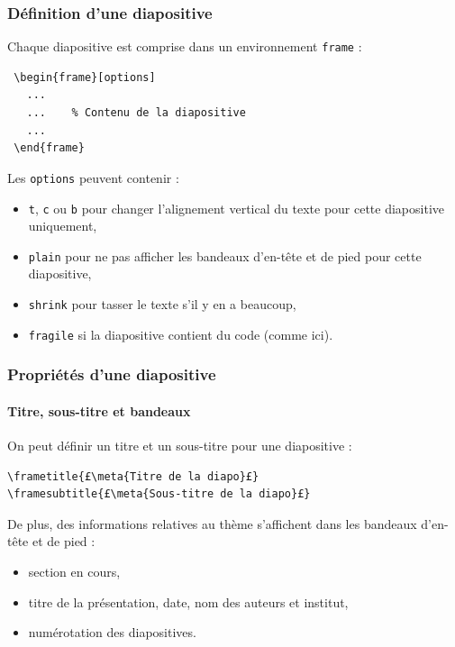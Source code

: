 \begin{frame}[fragile]
  \frametitle{Définition d'une diapositive}

Chaque diapositive est comprise dans un environnement \lstinline?frame? :

\begin{lstlisting}
 \begin{frame}[options]
   ...
   ...    % Contenu de la diapositive
   ...
 \end{frame}
\end{lstlisting}

\medskip
Les \lstinline?options? peuvent contenir :
\begin{itemize}
  \item \lstinline?t?, \lstinline?c? ou \lstinline?b? pour changer l'alignement vertical du texte pour cette diapositive uniquement,
  \item \lstinline?plain? pour ne pas afficher les bandeaux d'en-tête et de pied pour cette diapositive,
  \item \lstinline?shrink? pour tasser le texte s'il y en a beaucoup,
  \item \lstinline?fragile? si la diapositive contient du code (comme ici).
\end{itemize}
\end{frame}



\begin{frame}[fragile]
  \frametitle{Propriétés d'une diapositive}
  \framesubtitle{Titre, sous-titre et bandeaux}

On peut définir un titre et un sous-titre pour une diapositive :

\begin{lstlisting}
\frametitle{£\meta{Titre de la diapo}£}
\framesubtitle{£\meta{Sous-titre de la diapo}£}
\end{lstlisting}

\bigskip
De plus, des informations relatives au thème s'affichent dans les bandeaux d'en-tête et de pied :
\begin{itemize}
  \item section en cours,
  \item titre de la présentation, date, nom des auteurs et institut,
  \item numérotation des diapositives.
\end{itemize}
\end{frame}



